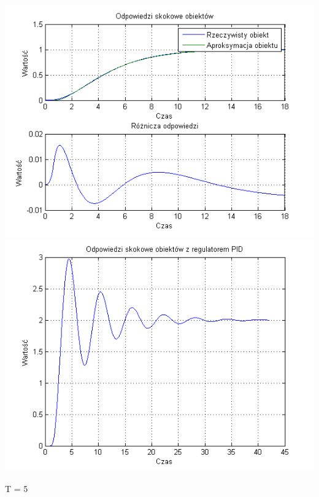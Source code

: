 \documentclass[10pt,a4paper]{article}
\begin{document}
\begin{center}
\includegraphics[scale=1]{images/dwa/skrypt_99.png}\\
\includegraphics[scale=1]{images/dwa/skrypt_100.png}\\
\end{center}
\newpage
T = 5
\end{document}
